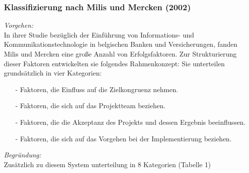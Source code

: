 \subsubsection{Klassifizierung nach Milis und Mercken (2002)}
\textit{Vorgehen:}\\\noindent
In ihrer Studie bezüglich der Einführung von Informations- und Kommunikationstechnologie in belgischen Banken und Versicherungen, 
fanden Milis und Mercken eine große Anzahl von Erfolgsfaktoren. Zur Strukturierung dieser Faktoren entwickelten sie folgendes Rahmenkonzept:
Sie unterteilen grundsätzlich in vier Kategorien:
\begin{itemize}\itemsep0pt
  \item[-]{Faktoren, die Einfluss auf die Zielkongruenz nehmen.}
  \item[-]{Faktoren, die sich auf das Projektteam beziehen.}
  \item[-]{Faktoren, die die Akzeptanz des Projekts und dessen Ergebnis beeinflussen.}
  \item[-]{Faktoren, die sich auf das Vorgehen bei der Implementierung beziehen.}  
\end{itemize}
\textit{Begründung:}\\\noindent
Zusätzlich zu diesem System unterteilung in 8 Kategorien (Tabelle 1)

